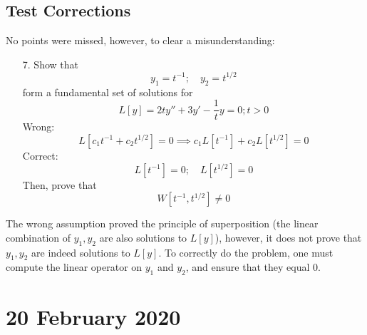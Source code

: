 \documentclass[twoside]{report}
\begin{document}
    \section{Test Corrections}
    No points were missed, however, to clear a misunderstanding:
    \begin{enumerate}
        \item[7.] Show that
        \begin{equation}
            y_{1} = t^{-1};\quad y_{2} = t^{1/2}
        \end{equation}
        form a fundamental set of solutions for
        \begin{equation}
            L[y] = 2ty'' + 3y' - \frac{1}{t}y = 0; t > 0
        \end{equation}
        Wrong:
        \begin{equation}
            L[c_{1}t^{-1} + c_{2}t^{1/2}] = 0 \implies c_{1}L[t^{-1}] + c_{2}L[t^{1/2}] = 0
        \end{equation}
        Correct:
        \begin{equation}
            L[t^{-1}] = 0;\quad L[t^{1/2}] = 0
        \end{equation}
        Then, prove that
        \begin{equation}
            W[t^{-1}, t^{1/2}] \neq 0
        \end{equation}
    \end{enumerate}
    The wrong assumption proved the principle of superposition (the linear combination of $y_{1}, y_{2}$ are also solutions to $L[y]$), however, it does not prove that $y_{1}, y_{2}$ are indeed solutions to $L[y]$.
    To correctly do the problem, one must compute the linear operator on $y_{1}$ and $y_{2}$, and ensure that they equal 0.
    \chapter{20 February 2020}
\end{document}
